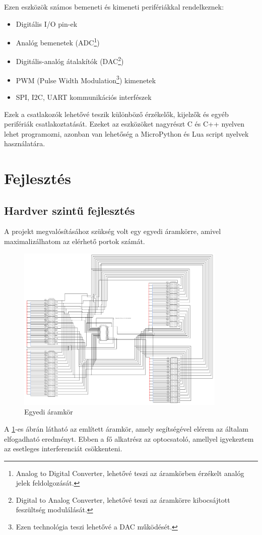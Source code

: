 \documentclass{thesis-ekf}
\theoremstyle{definition}
\theoremstyle{remark}
\begin{document}
	Ezen eszközök számos bemeneti és kimeneti perifériákkal rendelkeznek:
	\begin{itemize}
		\item Digitális I/O pin-ek
		\item Analóg bemenetek (ADC\footnote{Analog to Digital Converter, lehetővé teszi az áramkörben érzékelt analóg jelek feldolgozását.})
		\item Digitális-analóg átalakítók (DAC\footnote{Digital to Analog Converter, lehetővé teszi az áramkörre kibocsájtott feszültség modulálását.})
		\item PWM (Pulse Width Modulation\footnote{Ezen technológia teszi lehetővé a DAC működését.}) kimenetek
		\item SPI, I2C, UART kommunikációs interfészek
	\end{itemize}
	Ezek a csatlakozók lehetővé teszik különböző érzékelők, kijelzők és egyéb perifériák csatlakoztatását.
	Ezeket az eszközöket nagyrészt C és C++ nyelven lehet programozni, azonban van lehetőség a MicroPython és Lua script nyelvek használatára.
	\section{Fejlesztés}
	\subsection{Hardver szintű fejlesztés}
	A projekt megvalósításához szükség volt egy egyedi áramkörre, amivel maximalizálhatom az elérhető portok számát.
	\begin{figure}[!ht]
		\centering
		\includegraphics[width=10cm]{circuit}
		\caption{Egyedi áramkör}
		\label{img_circ}
	\end{figure}
	A \ref{img_circ}-es ábrán látható az említett áramkör, amely segítségével elérem az általam elfogadható eredményt. Ebben a fő alkatrész az optocsatoló, amellyel igyekeztem  az esetleges interferenciát csökkenteni.
	
\end{document}
